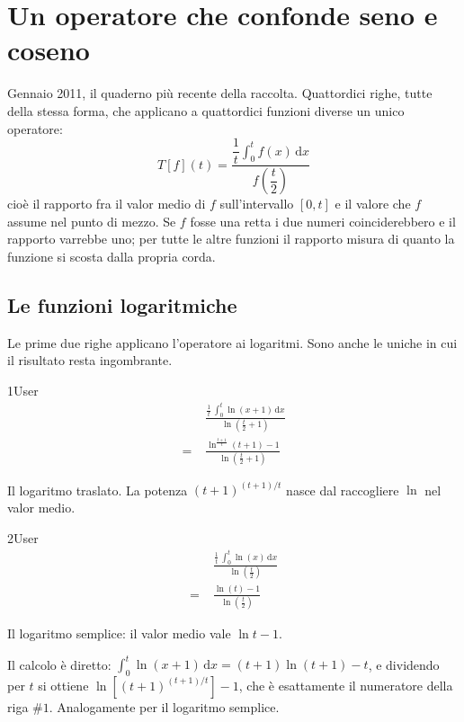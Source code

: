 \chapter{Un operatore che confonde seno e coseno}
\label{cap:trasformata-t}

Gennaio 2011, il quaderno più recente della raccolta. Quattordici righe, tutte della stessa forma, che applicano a quattordici funzioni diverse un unico operatore:
\[
  T[f](t)=\frac{\dfrac{1}{t}\displaystyle\int_0^t f(x)\,\mathrm{d}x}{f\!\left(\dfrac{t}{2}\right)}
\]
cioè il rapporto fra il valor medio di $f$ sull'intervallo $[0,t]$ e il valore che $f$ assume nel punto di mezzo. Se $f$ fosse una retta i due numeri coinciderebbero e il rapporto varrebbe uno; per tutte le altre funzioni il rapporto misura di quanto la funzione si scosta dalla propria corda.

\section{Le funzioni logaritmiche}

Le prime due righe applicano l'operatore ai logaritmi. Sono anche le uniche in cui il risultato resta ingombrante.

\begin{espr}{1}{User}{}
\begin{align*}
& \frac{\frac{1}{t}\, \int_{0}^{t} \ln\!\left(x + 1\right) \,\mathrm{d}x}{\ln\!\left(\frac{t}{2} + 1\right)} \\
=\;& \frac{\ln^{\frac{t + 1}{t}}\!\left(t + 1\right) - 1}{\ln\!\left(\frac{t}{2} + 1\right)}
\end{align*}
\end{espr}
Il logaritmo traslato. La potenza $(t+1)^{(t+1)/t}$ nasce dal raccogliere $\ln$ nel valor medio.

\begin{espr}{2}{User}{\verificata}
\begin{align*}
& \frac{\frac{1}{t}\, \int_{0}^{t} \ln\!\left(x\right) \,\mathrm{d}x}{\ln\!\left(\frac{t}{2}\right)} \\
=\;& \frac{\ln\!\left(t\right) - 1}{\ln\!\left(\frac{t}{2}\right)}
\end{align*}
\end{espr}
Il logaritmo semplice: il valor medio vale $\ln t-1$.


Il calcolo è diretto: $\int_0^t\ln(x+1)\,\mathrm{d}x=(t+1)\ln(t+1)-t$, e dividendo per $t$ si ottiene $\ln\!\left[(t+1)^{(t+1)/t}\right]-1$, che è esattamente il numeratore della riga $\#1$. Analogamente per il logaritmo semplice.

